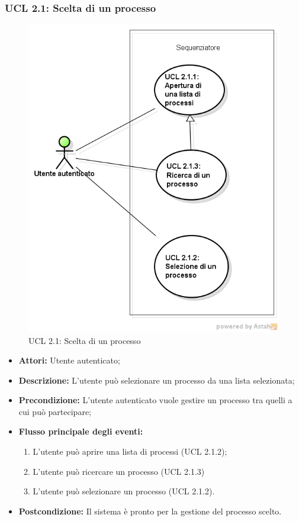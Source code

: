 \subsubsection{UCL 2.1: Scelta di un processo}
\begin{figure}[H]
\centering
\includegraphics[trim=0cm 0.8cm 0cm 0cm,clip=true,width=%
\textwidth]
{./grafici/L21}
\caption{UCL 2.1: Scelta di un processo}
\end{figure}
\begin{itemize}
\item \textbf{Attori:} Utente autenticato;
\item \textbf{Descrizione:} L'utente può selezionare un processo da una lista selezionata;
\item \textbf{Precondizione:} L'utente autenticato vuole gestire un processo tra quelli a cui può partecipare;
\item \textbf{Flusso principale degli eventi:}
\begin{enumerate}
\item L'utente può aprire una lista di processi (UCL 2.1.2);
\item L'utente può ricercare un processo (UCL 2.1.3)
\item L'utente può selezionare un processo (UCL 2.1.2).
\end{enumerate}
\item \textbf{Postcondizione:} Il sistema è pronto per la gestione del processo scelto.
\end{itemize}


